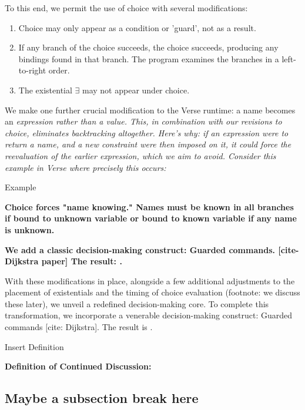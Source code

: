 \documentclass[manuscript,screen,review, 12pt]{acmart}
\begin{document}
\begin{outline}[enumerate]
        To this end, we permit the use of choice with several modifications:

        \begin{enumerate}
        \item Choice may only appear as a condition or 'guard', not as a result.
        \item If any branch of the choice succeeds, the choice succeeds,
        producing any bindings found in that branch. The program examines the
        branches in a left-to-right order.
        \item The existential $\exists$ may not appear under choice.
        \end{enumerate}

        We make one further crucial modification to the Verse runtime: a name
        becomes an \it{expression} rather than a \it{value}. This, in
        combination with our revisions to choice, eliminates backtracking
        altogether. Here's why: if an expression were to return a name, and a
        new constraint were then imposed on it, it could force the reevaluation
        of the earlier expression, which we aim to avoid. Consider this example
        in Verse where precisely this occurs:

    \2 Example 

        \bf{Choice forces "name knowing." Names must be known in all branches 
        if bound to unknown variable or bound to known variable if any name 
        is unknown}.
        
        \2 \bf{We add a classic decision-making construct: Guarded commands. }
        [cite- Dijkstra paper]
        \2 \bf{The result: \VMinus. }
        
        With these modifications in place, alongside a few additional
        adjustments to the placement of existentials and the timing of choice
        evaluation (footnote: we discuss these later), we unveil a redefined decision-making core. To complete this
        transformation, we incorporate a venerable decision-making construct:
        Guarded commands [cite: Dijkstra]. The result is \VMinus. 
        
        Insert Definition

    \1 \bf{Definition of \VMinus}
    \1 \bf{Continued Discussion:}

    \subsection{Maybe a subsection break here}
    

\end{outline}
\end{document}

